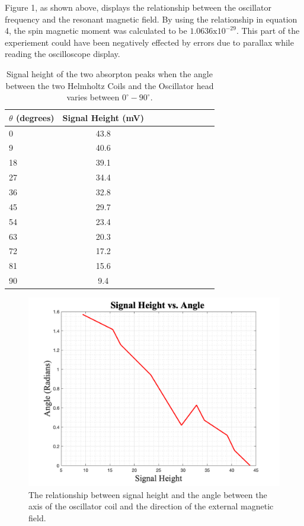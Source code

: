 \documentclass[twoside,10pt]{article}
\begin{document}
\begin{multicols}{2}
     Figure 1, as shown above, displays the relationship between the oscillator frequency and the resonant magnetic field. By using the relationship in equation 4, the spin magnetic moment was calculated to be $1.0636 \text{x} 10^{-29}$. This part of the experiement could have been negatively effected by errors due to parallax while reading the oscilloscope display. 

			\begin{table}[H]
	\centering
	\caption{ Signal height of the two absorpton peaks when the angle between the two Helmholtz Coils and the Oscillator head varies between $0^{\circ} - 90^{\circ}$.}
	\begin{tabular}{l c c rrrrrrr}
		\toprule				
		$\theta$ (degrees) & Signal Height (mV)  \\ [1ex]
		\midrule
		0 &	43.8  \\ [1.5ex]
		9	&	40.6 \\ [1.5ex]
		18	&	39.1  \\ [1.5ex]
		27  & 34.4 \\ [1.5ex]
		36  & 32.8 \\ [1.5ex]
		45 & 29.7 \\ [1.5ex]
		54 & 23.4 \\ [1.5ex]
		63 & 20.3 \\ [1.5ex]
		72 & 17.2  \\ [1.5ex]
		81 &  15.6 \\ [1.5ex]
		90 & 9.4 \\ [1.5ex]
		
		\bottomrule
	\end{tabular}
\end{table}


		\begin{figure}[H]
	\centering
	\includegraphics[width=\linewidth]{angle_vs_height.png}
	\caption{ The relationship between signal height and the angle between the axis of the oscillator coil and the direction of the external magnetic field. }
\end{figure}



\end{multicols}
\end{document}
